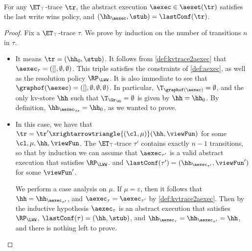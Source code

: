 \begin{proposition}
\label{prop:kvtrace2aexec}
For any $\ET_{\top}$-trace $\tr$, 
the abstract execution $\aexec \in \aeset(\tr)$ satisfies the last write wins policy,
and $(\hh_{\aexec}, \stub) = \lastConf(\tr)$.
\end{proposition}
\begin{proof}
Fix a $\ET_{\top}$-trace $\tau$. 
We prove by induction on the number of transitions $n$ in $\tau$. 
\begin{itemize}
\item {}
It means $\tr = (\hh_{0}, \stub)$.
It follows from \cref{def:kvtrace2aexec} that $\aexec_{\tau} = ([], \emptyset, \emptyset)$. 
This triple satisfies the constraints of \cref{def:aexec}, as well as the resolution policy $\RP_{\LWW}$. 
It is also immediate to see that $\graphof(\aexec) = ([], \emptyset, \emptyset, \emptyset)$.
In particular, $\T_{\graphof(\aexec)} = \emptyset$, 
and the only kv-store $\hh$ such that $\T_{\Gr_{\hh}} = \emptyset$ 
is given by $\hh = \hh_{0}$. 
By definition, $\hh_{\aexec_{\tr}} = \hh_{0}$, as we wanted to prove.

\item {} In this case, we have that $\tr = \tr' \xrightarrowtriangle{(\cl, \mu)} (\hh, \viewFun)$ 
for some $\cl, \mu, \hh, \viewFun$. The $\ET_{\top}$-trace $\tau'$ contains exactly $n-1$ transitions, 
so that by induction we can assume that $\aexec_{\tau'}$ is a valid abstract execution that satisfies 
$\RP_{\LWW}$. and $\lastConf(\tau') = (\hh_{\aexec_{\tau'}}, \viewFun')$ for some $\viewFun'$. 

We perform a case analysis on $\mu$. 
If $\mu = \varepsilon$, then it follows that $\hh = \hh_{\aexec_{\tau'}}$, 
and $\aexec_{\tau} = \aexec_{\tau'}$ by \cref{def:kvtrace2aexec}. 
Then by the inductive hypothesis $\aexec_{\tau}$ is an abstract execution that satisfies $\RP_{\LWW}$,
$\lastConf(\tau) = (\hh, \stub)$, and $\hh_{\aexec_{\tau}} = \hh_{\aexec_{\tau'}} = \hh$, 
and there is nothing left to prove. 


\end{itemize}
\end{proof}
